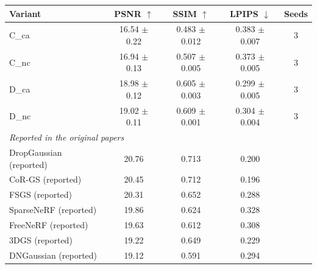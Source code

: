 \begin{tabular}{lcccc}
\toprule
Variant & PSNR $\uparrow$ & SSIM $\uparrow$ & LPIPS $\downarrow$ & Seeds \\
\midrule
C_ca & 16.54 $\pm$ 0.22 & 0.483 $\pm$ 0.012 & 0.383 $\pm$ 0.007 & 3 \\
C_nc & 16.94 $\pm$ 0.13 & 0.507 $\pm$ 0.005 & 0.373 $\pm$ 0.005 & 3 \\
D_ca & 18.98 $\pm$ 0.12 & 0.605 $\pm$ 0.003 & 0.299 $\pm$ 0.005 & 3 \\
D_nc & 19.02 $\pm$ 0.11 & 0.609 $\pm$ 0.001 & 0.304 $\pm$ 0.004 & 3 \\
\midrule
\multicolumn{5}{l}{\textit{Reported in the original papers}} \\
DropGaussian (reported) & 20.76 & 0.713 & 0.200 &  \\
CoR-GS (reported) & 20.45 & 0.712 & 0.196 &  \\
FSGS (reported) & 20.31 & 0.652 & 0.288 &  \\
SparseNeRF (reported) & 19.86 & 0.624 & 0.328 &  \\
FreeNeRF (reported) & 19.63 & 0.612 & 0.308 &  \\
3DGS (reported) & 19.22 & 0.649 & 0.229 &  \\
DNGaussian (reported) & 19.12 & 0.591 & 0.294 &  \\
\bottomrule
\end{tabular}
